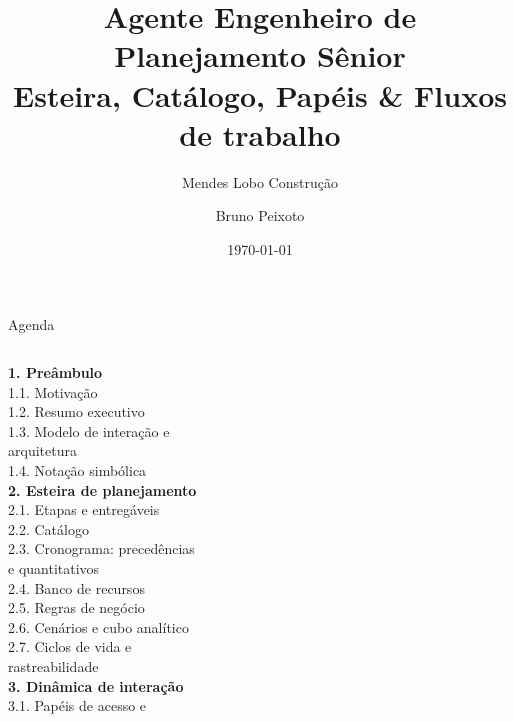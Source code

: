 \documentclass[aspectratio=169,10pt]{beamer}
\title{Agente Engenheiro de Planejamento Sênior\\[4pt]\large Esteira, Catálogo, Papéis \& Fluxos de trabalho}
\subtitle{Mendes Lobo Construção}
\author{Bruno Peixoto}
\date{\today}
\institute{Uso interno --- confidencial}
\begin{document}
\begin{frame}[plain]
  \titlepage
\end{frame}

\begin{frame}{Agenda}
  \begin{columns}[T]
    {\small\textbf{\textcolor{mlblue}{1. Preâmbulo}}}\\[4pt]
    {\footnotesize
    1.1. Motivação\\
    1.2. Resumo executivo\\
    1.3. Modelo de interação e\\
    \hspace*{10pt}arquitetura\\
    1.4. Notação simbólica\\}
    {\small\textbf{\textcolor{mlorange}{2. Esteira de planejamento}}}\\[4pt]
    {\footnotesize
    2.1. Etapas e entregáveis\\
    2.2. Catálogo\\
    2.3. Cronograma: precedências\\
    \hspace*{10pt}e quantitativos\\
    2.4. Banco de recursos\\
    2.5. Regras de negócio\\
    2.6. Cenários e cubo analítico\\
    2.7. Ciclos de vida e\\
    \hspace*{10pt}rastreabilidade\\}
    {\small\textbf{\textcolor{mlpurple}{3. Dinâmica de interação}}}\\[4pt]
    {\footnotesize
    3.1. Papéis de acesso e\\
}
\end{columns}
\end{frame}
\end{document}

